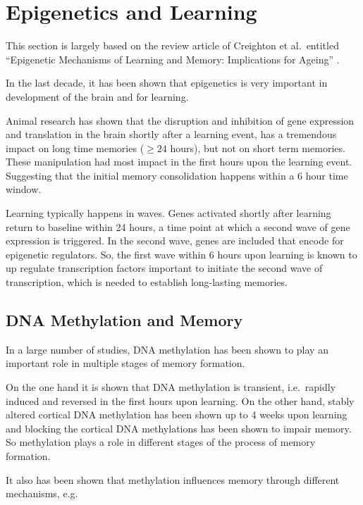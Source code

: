\documentclass[
  11pt,
]{book}
\begin{document}
\hypertarget{epigenetics-and-learning}{%
\section{Epigenetics and Learning}\label{epigenetics-and-learning}}

This section is largely based on the review article of Creighton et al.~entitled ``Epigenetic Mechanisms of Learning and Memory: Implications for Ageing'' \citep{Creighton2020}.

In the last decade, it has been shown that epigenetics is very important in development of the brain and for learning.

Animal research has shown that the disruption and inhibition of gene expression and translation in the brain shortly after a learning event, has a tremendous impact on long time memories (\(\geq 24\) hours), but not on short term memories. These manipulation had most impact in the first hours upon the learning event. Suggesting that the initial memory consolidation happens within a 6 hour time window.

Learning typically happens in waves. Genes activated shortly after learning return to baseline within 24 hours, a time point at which a second wave of gene expression is triggered.
In the second wave, genes are included that encode for epigenetic regulators.
So, the first wave within 6 hours upon learning is known to up regulate transcription factors important to initiate the second wave of transcription, which is needed to establish long-lasting memories.

\hypertarget{dna-methylation-and-memory}{%
\subsection{DNA Methylation and Memory}\label{dna-methylation-and-memory}}

In a large number of studies, DNA methylation has been shown to play an important role in multiple stages of memory formation.

On the one hand it is shown that DNA methylation is transient, i.e.~rapidly induced and reversed in the first hours upon learning. On the other hand, stably altered cortical DNA methylation has been shown up to 4 weeks upon learning and blocking the cortical DNA methylations has been shown to impair memory.
So methylation plays a role in different stages of the process of memory formation.

It also has been shown that methylation influences memory through different mechanisms, e.g.~
\end{document}
